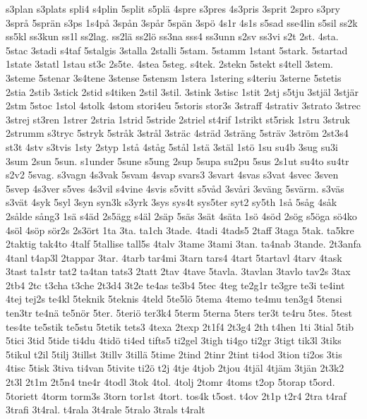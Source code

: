 {s3plan
s3plats
spli4
s4plin
5split
s5pl^^e4
4spre
s3pres
4s3pris
3sprit
2spro
s3pry
3spr^^e5
5spr^^e4n
s3ps
1s4p^^e5
3sp^^e5n
3sp^^e5r
5sp^^e4n
3sp^^f6
4s1r
4s1s
s5sad
sse4lin
s5sil
ss2k
ss5kl
ss3kun
ss1l
ss2lag.
ss2l^^e4
ss2l^^f6
ss3na
sss4
ss3unn
s2sv
ss3vi
s2t
2st.
4sta.
5stac
3stadi
s4taf
5stalgis
3stalla
2stalli
5stam.
5stamm
1stant
5stark.
5startad
1state
3statl
1stau
st3c
2s5te.
4stea
5steg.
s4tek.
2stekn
5stekt
s4tell
3stem.
3steme
5stenar
3s4tene
3stense
5stensm
1stera
1stering
s4teriu
3sterne
5stetis
2stia
2stib
3stick
2stid
s4tiken
2stil
3stil.
3stink
3stisc
1stit
2stj
s5tju
3stj^^e4l
3stj^^e4r
2stm
5stoc
1stol
4stolk
4stom
stori4eu
5storis
stor3s
3straff
4strativ
3strato
3strec
3strej
st3ren
1strer
2stria
1strid
5stride
2striel
st4rif
1strikt
st5risk
1stru
3struk
2strumm
s3tryc
5stryk
5str^^e5k
3str^^e5l
3str^^e4c
4str^^e4d
3str^^e4ng
5str^^e4v
3str^^f6m
2st3s4
st3t
4stv
s3tvis
1sty
2styp
1st^^e5
4st^^e5g
5st^^e5l
1st^^e4
3st^^e4l
1st^^f6
1su
su4b
3sug
su3i
3sum
2sun
5sun.
s1under
5sune
s5ung
2sup
5supa
su2pu
5sus
2s1ut
su4to
su4tr
s2v2
5svag.
s3vagn
4s3vak
5svam
4svap
svars3
3svart
4svas
s3vat
4svec
3sven
5svep
4s3ver
s5ves
4s3vil
s4vine
4svis
s5vitt
s5v^^e5d
3sv^^e5ri
3sv^^e4ng
5sv^^e4rm.
s3v^^e4s
s3v^^e4t
4syk
5syl
3syn
syn3k
s3yrk
3sys
sys4t
sys5ter
syt2
sy5th
1s^^e5
5s^^e5g
4s^^e5k
2s^^e5lde
s^^e5ng3
1s^^e4
s4^^e4d
2s5^^e4gg
s4^^e4l
2s^^e4p
5s^^e4s
3s^^e4t
4s^^e4ta
1s^^f6
4s^^f6d
2s^^f6g
s5^^f6ga
s^^f64ko
4s^^f6l
4s^^f6p
s^^f6r2s
2s3^^f6rt
1ta
3ta.
ta1ch
3tade.
4tadi
4tads5
2taff
3taga
5tak.
ta5kre
2taktig
tak4to
4talf
5tallise
tall5s
4talv
3tame
3tami
3tan.
ta4nab
3tande.
2t3anfa
4tanl
t4ap3l
2tappar
3tar.
4tarb
tar4mi
3tarn
tars4
4tart
5tartavl
4tarv
4task
3tast
ta1str
tat2
ta4tan
tats3
2tatt
2tav
4tave
5tavla.
3tavlan
3tavlo
tav2s
3tax
2tb4
2tc
t3cha
t3che
2t3d4
3t2e
te4as
te3b4
5tec
4teg
te2g1r
te3gre
te3i
te4int
4tej
tej2s
te4kl
5teknik
5teknis
4teld
5te5l^^f6
5tema
4temo
te4mu
ten3g4
5tensi
ten3tr
te4n^^e4
te5n^^f6r
5ter.
5teri^^f6
ter3k4
5term
5terna
5ters
ter3t
te4ru
5tes.
5test
tes4te
te5stik
te5stu
5tetik
tets3
4texa
2texp
2t1f4
2t3g4
2th
t4hen
1ti
3tial
5tib
5tici
3tid
5tide
ti4du
4tid^^f6
ti4ed
tifts5
ti2gel
3tigh
ti4go
ti2gr
3tigt
tik3l
3tiks
5tikul
t2il
5tilj
3tillst
3tillv
3till^^e4
5time
2tind
2tinr
2tint
ti4od
3tion
ti2os
3tis
4tisc
5tisk
3tiva
ti4van
5tivite
ti2^^f6
t2j
4tje
4tjob
2tjou
4tj^^e4l
4tj^^e4m
3tj^^e4n
2t3k2
2t3l
2t1m
2t5n4
tne4r
4todl
3tok
4tol.
4tolj
2tomr
4toms
t2op
5torap
t5ord.
5toriett
4torm
torm3s
3torn
tor1st
4tort.
tos4k
t5ost.
t4ov
2t1p
t2r4
2tra
t4raf
3trafi
3t4ral.
t4rala
3t4rale
5tralo
3trals
t4ralt
}
